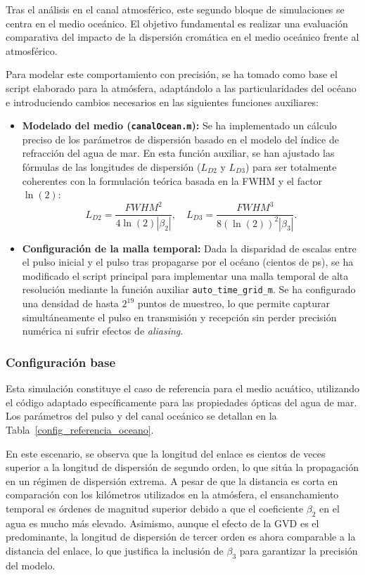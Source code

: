 Tras el análisis en el canal atmosférico, este segundo bloque de simulaciones se centra en el medio oceánico. El objetivo fundamental es realizar una evaluación comparativa del impacto de la dispersión cromática en el medio oceánico frente al atmosférico. 

Para modelar este comportamiento con precisión, se ha tomado como base el script elaborado para la atmósfera, adaptándolo a las particularidades del océano e introduciendo cambios necesarios en las siguientes funciones auxiliares:


\begin{itemize}
    \item \textbf{Modelado del medio (\texttt{canalOcean.m}):} Se ha implementado un cálculo preciso de los parámetros de dispersión basado en el modelo del índice de refracción del agua de mar. En esta función auxiliar, se han ajustado las fórmulas de las longitudes de dispersión ($L_{D2}$ y $L_{D3}$) para ser totalmente coherentes con la formulación teórica basada en la FWHM y el factor $\ln(2)$:
    \[ L_{D2} = \frac{FWHM^2}{4 \ln(2) |\beta_2|}, \quad L_{D3} = \frac{FWHM^3}{8 (\ln(2))^2 |\beta_3|} .\]

    \item \textbf{Configuración de la malla temporal:} Dada la disparidad de escalas entre el pulso inicial y el pulso tras propagarse por el océano (cientos de ps), se ha modificado el script principal para implementar una malla temporal de alta resolución mediante la función auxiliar \texttt{auto\_time\_grid\_m}. Se ha configurado una densidad de hasta $2^{19}$ puntos de muestreo, lo que permite capturar simultáneamente el pulso en transmisión y recepción sin perder precisión numérica ni sufrir efectos de \textit{aliasing}.
\end{itemize}

\subsubsection*{Configuración base}

Esta simulación constituye el caso de referencia para el medio acuático, utilizando el código adaptado específicamente para las propiedades ópticas del agua de mar. Los parámetros del pulso y del canal oceánico se detallan en la 
Tabla~\ref{config_referencia_oceano}.

En este escenario, se observa que la longitud del enlace es cientos de veces superior a la longitud de dispersión de segundo orden, lo que sitúa la propagación en un régimen de dispersión extrema. A pesar de que la distancia es corta en comparación con los kilómetros utilizados en la atmósfera, el ensanchamiento temporal es órdenes de magnitud superior debido a que el coeficiente $\beta_2$ en el agua es mucho más elevado. Asimismo, aunque el efecto de la GVD es el predominante, la longitud de dispersión de tercer orden es ahora comparable a la distancia del enlace, lo que justifica la inclusión de $\beta_3$ para garantizar la precisión del modelo. 


